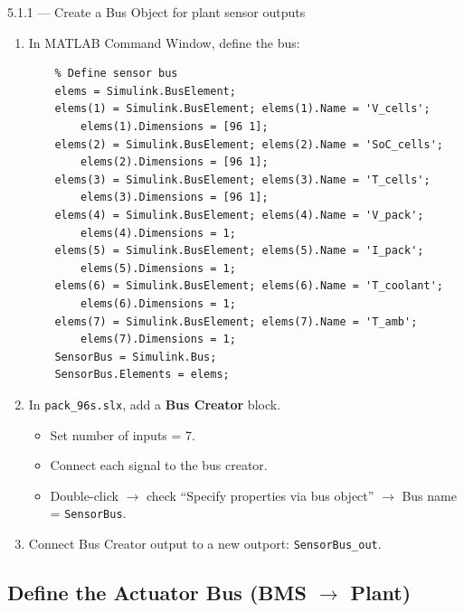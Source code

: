 \documentclass[11pt,a4paper]{article}
\begin{document}
\begin{guistep}{5.1.1 — Create a Bus Object for plant sensor outputs}
\begin{enumerate}
    \item In MATLAB Command Window, define the bus:
    \begin{verbatim}
    % Define sensor bus
    elems = Simulink.BusElement;
    elems(1) = Simulink.BusElement; elems(1).Name = 'V_cells';
        elems(1).Dimensions = [96 1];
    elems(2) = Simulink.BusElement; elems(2).Name = 'SoC_cells';
        elems(2).Dimensions = [96 1];
    elems(3) = Simulink.BusElement; elems(3).Name = 'T_cells';
        elems(3).Dimensions = [96 1];
    elems(4) = Simulink.BusElement; elems(4).Name = 'V_pack';
        elems(4).Dimensions = 1;
    elems(5) = Simulink.BusElement; elems(5).Name = 'I_pack';
        elems(5).Dimensions = 1;
    elems(6) = Simulink.BusElement; elems(6).Name = 'T_coolant';
        elems(6).Dimensions = 1;
    elems(7) = Simulink.BusElement; elems(7).Name = 'T_amb';
        elems(7).Dimensions = 1;
    SensorBus = Simulink.Bus;
    SensorBus.Elements = elems;
    \end{verbatim}
    \item In \texttt{pack\_96s.slx}, add a \textbf{Bus Creator} block.
    \begin{itemize}
        \item Set number of inputs = 7.
        \item Connect each signal to the bus creator.
        \item Double-click $\to$ check ``Specify properties via bus object'' $\to$ Bus name = \texttt{SensorBus}.
    \end{itemize}
    \item Connect Bus Creator output to a new outport: \texttt{SensorBus\_out}.
\end{enumerate}
\end{guistep}

\subsection{Define the Actuator Bus (BMS $\to$ Plant)}
\end{document}
